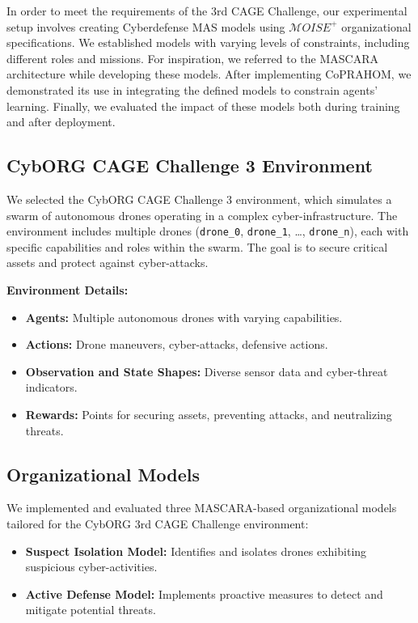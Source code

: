 \documentclass[conference]{IEEEtran}
\begin{document}
In order to meet the requirements of the 3rd CAGE Challenge, our experimental setup involves creating Cyberdefense MAS models using $\mathcal{M}OISE^+$ organizational specifications. We established models with varying levels of constraints, including different roles and missions. For inspiration, we referred to the MASCARA architecture while developing these models. After implementing CoPRAHOM, we demonstrated its use in integrating the defined models to constrain agents' learning. Finally, we evaluated the impact of these models both during training and after deployment.

\subsection{CybORG CAGE Challenge 3 Environment}

We selected the CybORG CAGE Challenge 3 environment, which simulates a swarm of autonomous drones operating in a complex cyber-infrastructure. The environment includes multiple drones (\texttt{drone\_0}, \texttt{drone\_1}, \ldots, \texttt{drone\_n}), each with specific capabilities and roles within the swarm. The goal is to secure critical assets and protect against cyber-attacks.

\textbf{Environment Details:}
\begin{itemize}
    \item \textbf{Agents:} Multiple autonomous drones with varying capabilities.
    \item \textbf{Actions:} Drone maneuvers, cyber-attacks, defensive actions.
    \item \textbf{Observation and State Shapes:} Diverse sensor data and cyber-threat indicators.
    \item \textbf{Rewards:} Points for securing assets, preventing attacks, and neutralizing threats.
\end{itemize}

\subsection{Organizational Models}

We implemented and evaluated three MASCARA-based organizational models tailored for the CybORG 3rd CAGE Challenge environment:

\begin{itemize}
    \item \textbf{Suspect Isolation Model:} Identifies and isolates drones exhibiting suspicious cyber-activities.
    \item \textbf{Active Defense Model:} Implements proactive measures to detect and mitigate potential threats.
\end{itemize}
\end{document}
